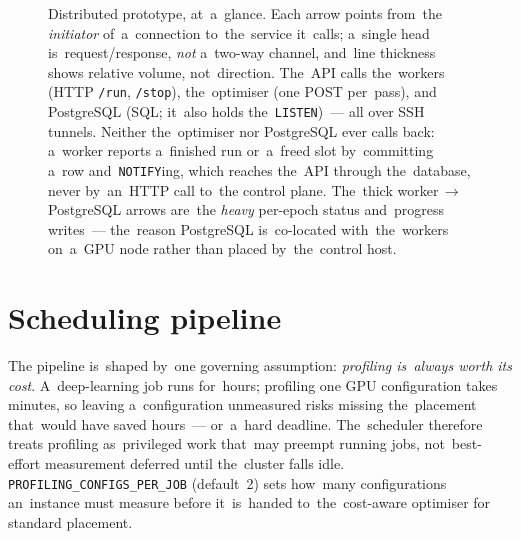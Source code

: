 \begin{figure}[H]
\caption{Distributed prototype, at~a~glance.  Each arrow points from~the
\emph{initiator} of~a~connection to~the~service it~calls; a~single head
is~request/response, \emph{not} a~two-way channel, and~line thickness shows
relative volume, not~direction.  The~API calls the~workers (HTTP
\texttt{/run}, \texttt{/stop}), the~optimiser (one POST per~pass), and
PostgreSQL (SQL; it~also holds the~\texttt{LISTEN})~--- all over SSH tunnels.
Neither the~optimiser nor PostgreSQL ever calls back: a~worker reports
a~finished run or~a~freed slot by~committing a~row and~\texttt{NOTIFY}ing,
which reaches the~API through the~database, never by~an~HTTP call to~the
control plane.  The~thick worker\,$\rightarrow$\,PostgreSQL arrows are~the
\emph{heavy} per-epoch status and~progress writes~--- the~reason PostgreSQL
is~co-located with~the~workers on~a~GPU node rather than placed by~the~control
host.}
\label{fig:prototype}
\end{figure}

\section{Scheduling pipeline}\label{sec:sched-pipeline}

The pipeline is~shaped by~one governing assumption: \emph{profiling is~always
worth its cost}.  A~deep-learning job runs for~hours; profiling one GPU
configuration takes minutes, so leaving a~configuration unmeasured risks missing
the~placement that~would have saved hours~--- or~a~hard deadline.  The~scheduler
therefore treats profiling as~privileged work that~may preempt running jobs,
not~best-effort measurement deferred until the~cluster falls idle.
\texttt{PROFILING\_CONFIGS\_PER\_JOB} (default~2) sets how~many configurations
an~instance must measure before it~is~handed to~the~cost-aware optimiser for
standard placement.


